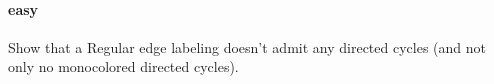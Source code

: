 \paragraph{easy}
Show that a Regular edge labeling doesn't admit any directed cycles (and not only no monocolored directed cycles).
